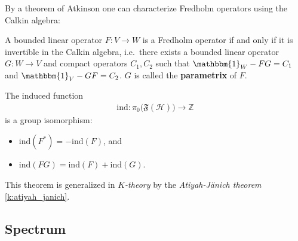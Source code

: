 
    By a theorem of Atkinson one can characterize Fredholm operators using the Calkin algebra:
    \begin{property}[Atkinson]
        A bounded linear operator $F:V\rightarrow W$ is a Fredholm operator if and only if it is invertible in the Calkin algebra, i.e.~there exists a bounded linear operator $G:W\rightarrow V$ and compact operators $C_1,C_2$ such that $\mathbbm{1}_W-FG=C_1$ and $\mathbbm{1}_V-GF=C_2$. $G$ is called the \textbf{parametrix} of $F$.
    \end{property}


    \begin{property}
        The induced function
        \begin{gather}
            \mathrm{ind}:\pi_0\big(\mathfrak{F}(\mathcal{H})\big)\rightarrow\mathbb{Z}
        \end{gather}
        is a group isomorphism:
        \begin{itemize}
            \item $\mathrm{ind}(F^*)=-\mathrm{ind}(F)$, and
            \item $\mathrm{ind}(FG) = \mathrm{ind}(F)+\mathrm{ind}(G)$.
        \end{itemize}
        This theorem is generalized in \textit{$K$-theory} by the \textit{Atiyah-J\"anich theorem} \ref{k:atiyah_janich}.
    \end{property}

\subsection{Spectrum}\label{section:spectrum}


